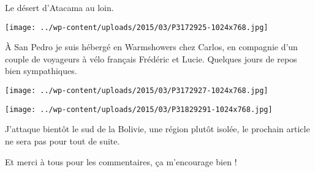 \pagebreak
 Le désert d'Atacama au loin. 
\begin{center} \texttt{[image: ../wp-content/uploads/2015/03/P3172925-1024x768.jpg]} \end{center}

 \`A San Pedro je suis hébergé en Warmshowers chez Carlos, en compagnie d'un couple de voyageurs à vélo français Frédéric et Lucie. Quelques jours de repos bien sympathiques. 
\begin{center} \texttt{[image: ../wp-content/uploads/2015/03/P3172927-1024x768.jpg]} \end{center}
\begin{center} \texttt{[image: ../wp-content/uploads/2015/03/P31829291-1024x768.jpg]} \end{center}

J'attaque bientôt le sud de la Bolivie, une région plutôt isolée, le prochain article ne sera pas pour tout de suite.

 Et merci à tous pour les commentaires, ça m'encourage bien !

